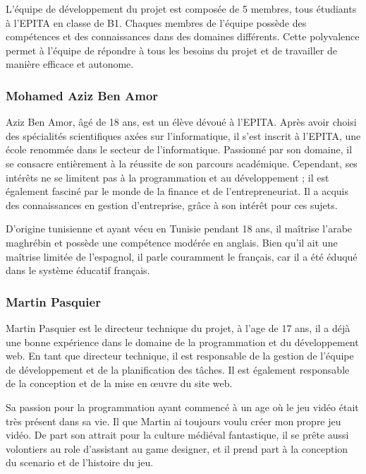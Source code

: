 
L'équipe de développement du projet est composée de 5 membres, tous étudiants à l'EPITA en classe de B1.
Chaques membres de l'équipe possède des compétences et des connaissances dans des domaines différents.
Cette polyvalence permet à l'équipe de répondre à tous les besoins du projet et de travailler de manière efficace et autonome.


\subsubsection*{Mohamed Aziz Ben Amor}

Aziz Ben Amor, âgé de 18 ans, est un élève dévoué à l'EPITA. 
Après avoir choisi des spécialités scientifiques axées sur l'informatique, il s'est inscrit à l'EPITA, une école renommée dans le secteur de l'informatique. 
Passionné par son domaine, il se consacre entièrement à la réussite de son parcours académique.
Cependant, ses intérêts ne se limitent pas à la programmation et au développement ; il est également fasciné par le monde de la finance et de l'entrepreneuriat. 
Il a acquis des connaissances en gestion d'entreprise, grâce à son intérêt pour ces sujets. 

D'origine tunisienne et ayant vécu en Tunisie pendant 18 ans, il maîtrise l'arabe maghrébin et possède une compétence modérée en anglais. 
Bien qu'il ait une maîtrise limitée de l'espagnol, il parle couramment le français, car il a été éduqué dans le système éducatif français.


\subsubsection*{Martin Pasquier}
    
Martin Pasquier est le directeur technique du projet, à l'age de 17 ans, il a déjà une bonne expérience dans le domaine de la programmation et du développement web.   
En tant que directeur technique, il est responsable de la gestion de l'équipe de développement et de la planification des tâches.
Il est également responsable de la conception et de la mise en œuvre du site web.

Sa passion pour la programmation ayant commencé à un age où le jeu vidéo était très présent dans sa vie.
Il  que Martin ai toujours voulu créer mon propre jeu vidéo.
De part son attrait pour la culture médiéval fantastique, il se prête aussi volontiers au role d'assistant au game designer, et il prend part à la conception du scenario et de l'histoire du jeu.

